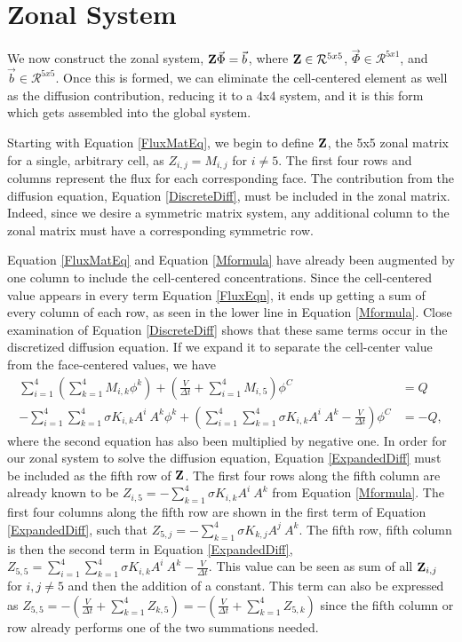 \documentclass[11pt,letterpaper,oneside,notitlepage]{article}	%
\newcommand{\eq}[1]{Equation \eqref{#1}}		%
\newcommand{\pindent}[1]{\hspace{6mm}}  		%
\numberwithin{equation}{section}				%
\begin{document}
\section{Zonal System}%
\label{sec:zonal}
\pindent{}We now construct the zonal system, ${\bf Z}\vec\Phi=\vec b$, where ${\bf Z}\in\mathcal{R}^{5x5}$, $\vec\Phi\in\mathcal{R}^{5x1}$, and $\vec b\in\mathcal{R}^{5x5}$. Once this is formed, we can eliminate the cell-centered element as well as the diffusion contribution, reducing it to a 4x4 system, and it is this form which gets assembled into the global system. 

Starting with \eq{FluxMatEq}, we begin to define $\bf Z$, the 5x5 zonal matrix for a single, arbitrary cell, as $Z_{i,j}=M_{i,j}$ for $i\neq 5$.  The first four rows and columns represent the flux for each corresponding face.  The contribution from the diffusion equation, \eq{DiscreteDiff}, must be included in the zonal matrix. Indeed, since we desire a symmetric matrix system, any additional column to the zonal matrix must have a corresponding symmetric row.  

\eq{FluxMatEq} and \eq{Mformula} have already been augmented by one column to include the cell-centered concentrations. Since the cell-centered value appears in every term \eq{FluxEqn}, it ends up getting a sum of every column of each row, as seen in the lower line in \eq{Mformula}. Close examination of \eq{DiscreteDiff} shows that these same terms occur in the discretized diffusion equation. If we expand it to separate the cell-center value from the face-centered values, we have
\begin{align}
\sum_{i=1}^4 \left( \sum_{k=1}^4 M_{i,k} \phi^k \right)+\left(\frac{V}{\Delta t}+\sum_{i=1}^4 M_{i,5}\right) \phi^C &=Q \\
-\sum_{i=1}^4 \sum_{k=1}^4 \sigma K_{i,k}A^i\ A^k \phi^k+\left(\sum_{i=1}^4 \sum_{k=1}^4 \sigma K_{i,k}A^i\ A^k - \frac{V}{\Delta t}\right) \phi^C &=-Q \label{ExpandedDiff}
,\end{align}
where the second equation has also been multiplied by negative one. In order for our zonal system to solve the diffusion equation, \eq{ExpandedDiff} must be included as the fifth row of $\bf Z$. The first four rows along the fifth column are already known to be $Z_{i,5}=-\sum_{k=1}^4 \sigma K_{i,k}A^i\ A^k$ from \eq{Mformula}. The first four columns along the fifth row are shown in the first term of \eq{ExpandedDiff}, such that $Z_{5,j}=-\sum_{k=1}^4 \sigma K_{k,j} A^j\ A^k$. The fifth row, fifth column is then the second term in \eq{ExpandedDiff}, $Z_{5,5}=\sum_{i=1}^4 \sum_{k=1}^4 \sigma K_{i,k}A^i\ A^k-\frac{V}{\Delta t}$. This value can be seen as sum of all ${\bf Z}_{i,j}$ for  $i,j\neq5 $ and then the addition of a constant. This term can also be expressed as $Z_{5,5}=-(\frac{V}{\Delta t}+\sum_{k=1}^4 Z_{k,5})=-(\frac{V}{\Delta t}+\sum_{k=1}^4 Z_{5,k})$ since the fifth column or row already performs one of the two summations needed.
\end{document}
